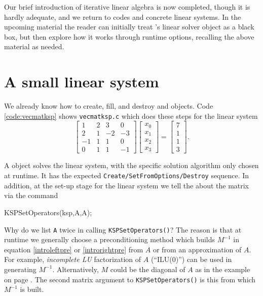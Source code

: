 Our brief introduction of iterative linear algebra is now completed, though it is hardly adequate, and we return to \PETSc codes and concrete linear systems.  In the upcoming material the reader can initially treat \PETSc's \pKSP linear solver object as a black box, but then explore how it works through runtime options, recalling the above material as needed.


\section{A small linear system}

We already know how to create, fill, and destroy \pVec and \pMat objects.  Code \ref{code:vecmatksp} shows \texttt{vecmatksp.c} which does these steps for the linear system
\begin{equation}
\begin{bmatrix} 1 & 2 & 3 & 0 \\
                2 & 1 &-2 &-3 \\
               -1 & 1 & 1 & 0 \\
                0 & 1 & 1 &-1 \end{bmatrix}
\begin{bmatrix} x_0 \\ x_1 \\ x_2 \\ x_3 \end{bmatrix}
=
\begin{bmatrix} 7 \\ 1 \\ 1 \\ 3 \end{bmatrix}.
\end{equation}

A \pKSP object solves the linear system, with the specific solution algorithm only chosen at runtime.  It has the expected \texttt{Create/SetFromOptions/Destroy} sequence.  In addition, at the set-up stage for the linear system we tell the \pKSP about the matrix via the command
\begin{code}
KSPSetOperators(ksp,A,A);
\end{code}
Why do we list \texttt{A} twice in calling \texttt{KSPSetOperators()}?  The reason is that at runtime we generally choose a preconditioning method which builds $M^{-1}$ in equation \eqref{introleftpre} or \eqref{introrightpre} from $A$ or from an approximation of $A$.  For example, \emph{incomplete LU} factorization of $A$ (``ILU($0$)'') can be used in generating $M^{-1}$.  Alternatively, $M$ could be the diagonal of $A$ as in the example on page \pageref{example:ls:jacobirichardson}.  The second matrix argument to \texttt{KSPSetOperators()} is this \pMat from which $M^{-1}$ is built.


